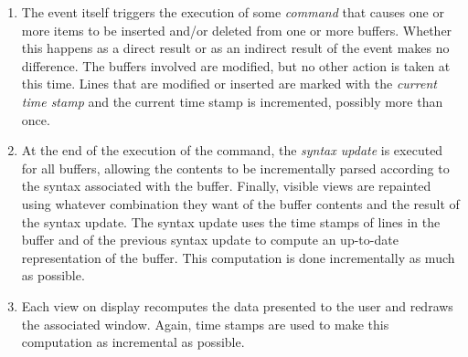 \begin{enumerate}
\item The event itself triggers the execution of some \emph{command}
  that causes one or more items to be inserted and/or deleted from one
  or more buffers.  Whether this happens as a direct result or as an
  indirect result of the event makes no difference.  The buffers
  involved are modified, but no other action is taken at this time.
  Lines that are modified or inserted are marked with the
  \emph{current time stamp} and the current time stamp is
  incremented, possibly more than once. 
\item At the end of the execution of the command, the \emph{syntax
  update} is executed for all buffers, allowing the contents to be
  incrementally parsed according to the syntax associated with the
  buffer.%
  Finally, visible views are repainted using whatever
  combination they want of the buffer contents and the result of the
  syntax update.  The syntax update uses the time stamps of lines in
  the buffer and of the previous syntax update to compute an
  up-to-date representation of the buffer.  This computation is done
  incrementally as much as possible.
\item Each view on display recomputes the data presented to the user
  and redraws the associated window.  Again, time stamps are used to
  make this computation as incremental as possible.
\end{enumerate}

